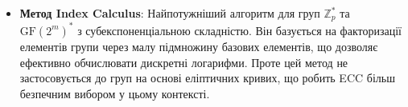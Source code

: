 \documentclass[12pt]{report}
\theoremstyle{definition}
\theoremstyle{plain}
\begin{document}
\begin{itemize}
    \item \textbf{Метод Index Calculus}: Найпотужніший алгоритм для груп \( \mathbb{Z}^*_p \) та \( \text{GF}(2^m)^* \) з субекспоненціальною складністю. Він базується на факторизації елементів групи через малу підмножину базових елементів, що дозволяє ефективно обчислювати дискретні логарифми. Проте цей метод не застосовується до груп на основі еліптичних кривих, що робить ECC більш безпечним вибором у цьому контексті.
\end{itemize}
\end{document}
